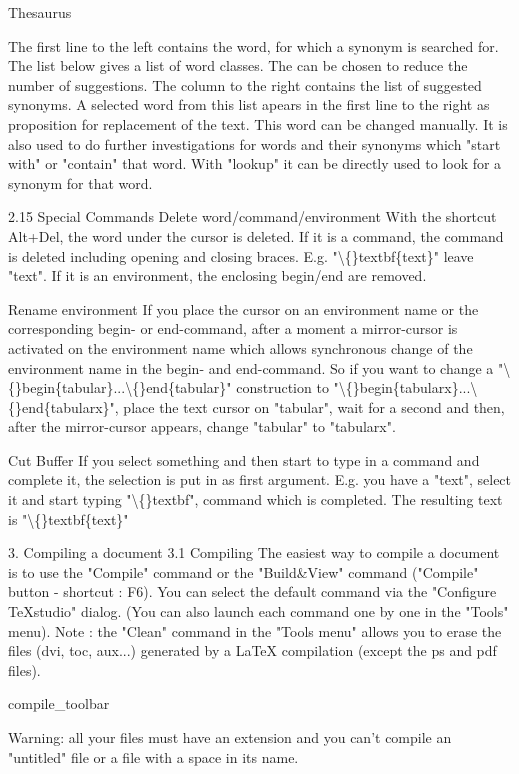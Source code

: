 \documentclass{article}
\begin{document}
	Thesaurus
	
	The first line to the left contains the word, for which a synonym is searched for. The list below gives a list of word classes. The can be chosen to reduce the number of suggestions. The column to the right contains the list of suggested synonyms. A selected word from this list apears in the first line to the right as proposition for replacement of the text. This word can be changed manually. It is also used to do further investigations for words and their synonyms which "start with" or "contain" that word. With "lookup" it can be directly used to look for a synonym for that word.
	
	2.15 Special Commands
	Delete word/command/environment
	With the shortcut Alt+Del, the word under the cursor is deleted. If it is a command, the command is deleted including opening and closing braces. E.g. "\textbackslash\{\}textbf\{text\}" leave "text". If it is an environment, the enclosing begin/end are removed.
	
	Rename environment
	If you place the cursor on an environment name or the corresponding begin- or end-command, after a moment a mirror-cursor is activated on the environment name which allows synchronous change of the environment name in the begin- and end-command. So if you want to change a "\textbackslash\{\}begin\{tabular\}...\textbackslash\{\}end\{tabular\}" construction to "\textbackslash\{\}begin\{tabularx\}...\textbackslash\{\}end\{tabularx\}", place the text cursor on "tabular", wait for a second and then, after the mirror-cursor appears, change "tabular" to "tabularx".
	
	Cut Buffer
	If you select something and then start to type in a command and complete it, the selection is put in as first argument. E.g. you have a "text", select it and start typing "\textbackslash\{\}textbf", command which is completed. The resulting text is "\textbackslash\{\}textbf\{text\}"
	
	3. Compiling a document
	3.1 Compiling
	The easiest way to compile a document is to use the "Compile" command or the "Build\&View" command ("Compile" button - shortcut : F6). You can select the default command via the "Configure TeXstudio" dialog.
	(You can also launch each command one by one in the "Tools" menu).
	Note : the "Clean" command in the "Tools menu" allows you to erase the files (dvi, toc, aux...) generated by a LaTeX compilation (except the ps and pdf files).
	
	compile\_toolbar
	
	Warning: all your files must have an extension and you can't compile an "untitled" file or a file with a space in its name.
	
\end{document}

